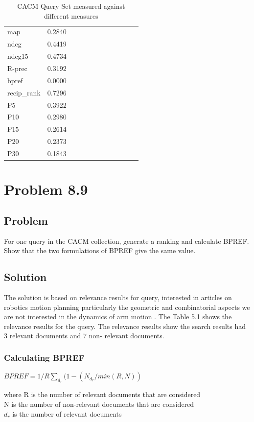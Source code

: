 \documentclass[12pt]{report}
\begin{document}
\begin{table}[]
\centering
\caption{CACM Query Set measured against different measures}
\label{my-label}
\begin{tabular}{llllllllllll}
map          &0.2840  \\
ndcg         &  0.4419     \\
ndcg15     & 0.4734  \\
R-prec      & 0.3192 \\
bpref        & 0.0000 \\
recip\_rank & 0.7296 \\
P5            & 0.3922 \\
P10          & 0.2980 \\
P15          & 0.2614 \\
P20          & 0.2373 \\
P30          & 0.1843  
\end{tabular}
\end{table}

\chapter{Problem 8.9}
\section{Problem}
For one query in the CACM collection, generate a ranking and calculate BPREF. Show that the two formulations of BPREF give the same value.
\section{Solution}
The solution is based on relevance results for query, interested in articles on robotics  motion planning particularly the geometric and combinatorial aspects   we are not interested in the dynamics of arm motion . The Table 5.1 shows the relevance results for the query. The relevance results show the search results had 3 relevant documents and 7 non- relevant documents. 



\subsection{Calculating BPREF}

$BPREF = 1/R \sum\limits_{d_r}^{}(1- ({N_{d_r}} / min(R,N))$

where R is the number of relevant documents that are considered\\
N is the number of non-relevant documents that are considered\\
$d_r$ is the number of relevant documents\\
 
\end{document}
